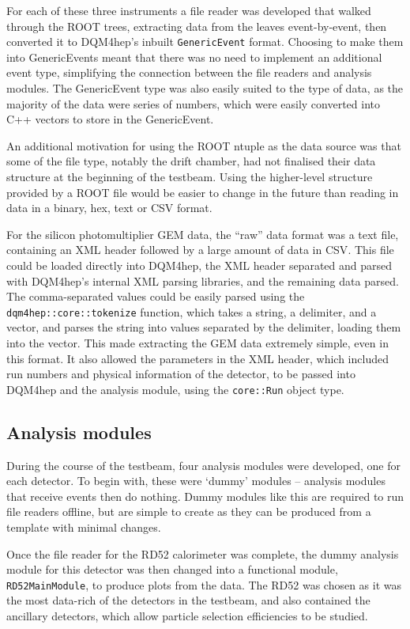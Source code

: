 For each of these three instruments a file reader was developed that walked through the ROOT trees, extracting data from the leaves event-by-event, then converted it to DQM4hep's inbuilt \texttt{GenericEvent} format. Choosing to make them into GenericEvents meant that there was no need to implement an additional event type, simplifying the connection between the file readers and analysis modules. The GenericEvent type was also easily suited to the type of data, as the majority of the data were series of numbers, which were easily converted into C++ vectors to store in the GenericEvent.

An additional motivation for using the ROOT ntuple as the data source was that some of the file type, notably the drift chamber, had not finalised their data structure at the beginning of the testbeam. Using the higher-level structure provided by a ROOT file would be easier to change in the future than reading in data in a binary, hex, text or CSV format.

For the silicon photomultiplier GEM data, the ``raw'' data format was a text file, containing an \acrshort{XML} header followed by a large amount of data in \acrfull{CSV}. This file could be loaded directly into DQM4hep, the XML header separated and parsed with DQM4hep's internal XML parsing libraries, and the remaining data parsed. The comma-separated values could be easily parsed using the \texttt{dqm4hep::core::tokenize} function, which takes a string, a delimiter, and a vector, and parses the string into values separated by the delimiter, loading them into the vector. This made extracting the GEM data extremely simple, even in this format. It also allowed the parameters in the XML header, which included run numbers and physical information of the detector, to be passed into DQM4hep and the analysis module, using the \texttt{core::Run} object type.

\subsection{Analysis modules}
During the course of the testbeam, four analysis modules were developed, one for each detector. To begin with, these were `dummy' modules -- analysis modules that receive events then do nothing. Dummy modules like this are required to run file readers offline, but are simple to create as they can be produced from a template with minimal changes.

Once the file reader for the RD52 calorimeter was complete, the dummy analysis module for this detector was then changed into a functional module, \texttt{RD52MainModule}, to produce plots from the data. The RD52 was chosen as it was the most data-rich of the detectors in the testbeam, and also contained the ancillary detectors, which allow particle selection efficiencies to be studied.

